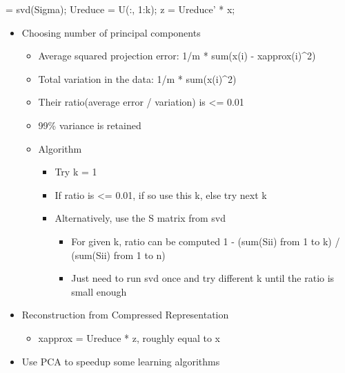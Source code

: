\documentclass[]{article}
\newenvironment{Shaded}{}{}
\newcommand{\FloatTok}[1]{\textcolor[rgb]{0.25,0.63,0.44}{#1}}
\newcommand{\NormalTok}[1]{#1}
\providecommand{\tightlist}{%
  \setlength{\itemsep}{0pt}\setlength{\parskip}{0pt}}
\begin{document}
\begin{Shaded}
\begin{Highlighting}[]
\NormalTok{[U, S, V] = svd(Sigma);}
\NormalTok{Ureduce = U(:, }\FloatTok{1}\NormalTok{:k);}
\NormalTok{z = Ureduce' * x;}
\end{Highlighting}
\end{Shaded}

\begin{itemize}
\tightlist
\item
  Choosing number of principal components

  \begin{itemize}
  \tightlist
  \item
    Average squared projection error: 1/m * sum(\textbar{}\textbar{}x(i)
    - xapprox(i)\textbar{}\textbar{}\^{}2)
  \item
    Total variation in the data: 1/m *
    sum(\textbar{}\textbar{}x(i)\textbar{}\textbar{}\^{}2)
  \item
    Their ratio(average error / variation) is \textless{}= 0.01
  \item
    99\% variance is retained
  \item
    Algorithm

    \begin{itemize}
    \tightlist
    \item
      Try k = 1
    \item
      If ratio is \textless{}= 0.01, if so use this k, else try next k
    \item
      Alternatively, use the S matrix from svd

      \begin{itemize}
      \tightlist
      \item
        For given k, ratio can be computed 1 - (sum(Sii) from 1 to k) /
        (sum(Sii) from 1 to n)
      \item
        Just need to run svd once and try different k until the ratio is
        small enough
      \end{itemize}
    \end{itemize}
  \end{itemize}
\item
  Reconstruction from Compressed Representation

  \begin{itemize}
  \tightlist
  \item
    xapprox = Ureduce * z, roughly equal to x
  \end{itemize}
\item
  Use PCA to speedup some learning algorithms


\end{itemize}
\end{document}
